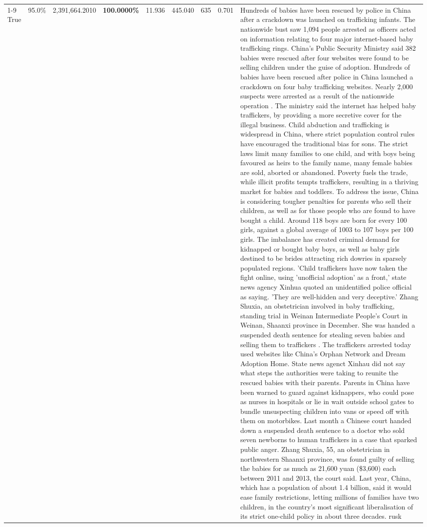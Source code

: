 \begin{table}[H]
\begin{tabular}{lllrlllll}
\cline{1-9}
True & 95.0\% & 2,391,664.2010 & \bfseries \color{red} 100.0000\% & 11.936 & 445.040 & 635 & 0.701 & Hundreds of babies have been rescued by police in China after a crackdown was launched on trafficking infants. The nationwide bust saw 1,094 people arrested as officers acted on information relating to four major internet-based baby trafficking rings. China's Public Security Ministry said 382 babies were rescued after four websites were found to be selling children under the guise of adoption. Hundreds of babies have been rescued after police in China launched a crackdown on four baby trafficking websites. Nearly 2,000 suspects were arrested as a result of the nationwide operation . The ministry said the internet has helped baby traffickers, by providing a more secretive cover for the illegal business. Child abduction and trafficking is widespread in China, where strict population control rules have encouraged the traditional bias for sons. The strict laws limit many families to one child, and with boys being favoured as heirs to the family name, many female babies are sold, aborted or abandoned. Poverty fuels the trade, while illicit profits tempts traffickers, resulting in a thriving market for babies and toddlers. To address the issue, China is considering tougher penalties for parents who sell their children, as well as for those people who are found to have bought a child. Around 118 boys are born for every 100 girls, against a global average of 1003 to 107 boys per 100 girls. The imbalance has created criminal demand for kidnapped or bought baby boys, as well as baby girls destined to be brides attracting rich dowries in sparsely populated regions. 'Child traffickers have now taken the fight online, using 'unofficial adoption' as a front,' state news agency Xinhua quoted an unidentified police official as saying. 'They are well-hidden and very deceptive.' Zhang Shuxia, an obstetrician involved in baby trafficking, standing trial in Weinan Intermediate People's Court in Weinan, Shaanxi province in December. She was handed a suspended death sentence for stealing seven babies and selling them to traffickers . The traffickers arrested today used websites like China's Orphan Network and Dream Adoption Home. State news agenct Xinhau did not say what steps the authorities were taking to reunite the rescued babies with their parents. Parents in China have been warned to guard against kidnappers, who could pose as nurses in hospitals or lie in wait outside school gates to bundle unsuspecting children into vans or speed off with them on motorbikes. Last month a Chinese court handed down a suspended death sentence to a doctor who sold seven newborns to human traffickers in a case that sparked public anger. Zhang Shuxia, 55, an obstetrician in northwestern Shaanxi province, was found guilty of selling the babies for as much as 21,600 yuan (\$3,600) each between 2011 and 2013, the court said. Last year, China, which has a population of about 1.4 billion, said it would ease family restrictions, letting millions of families have two children, in the country's most significant liberalisation of its strict one-child policy in about three decades. rusk \\

\end{tabular}
\end{table}
